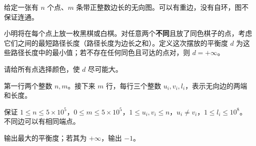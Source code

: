 \Legend
给定一张有 $n$ 个点、$m$ 条带正整数边长的无向图。可以有重边，没有自环，图不保证连通。

小明将在每个点上放一枚黑棋或白棋。对任意两个\textbf{不同}且放了同色棋子的点，考虑它们之间的最短路径长度（路径长度为边长之和）。定义这次摆放的平衡度 $d$ 为这些路径长度中的最小值；若不存在任何同色且可达的点对，则 $d=+\infty$。

请给所有点选择颜色，使 $d$ 尽可能大。

\Input

第一行两个整数 $n,m$。接下来 $m$ 行，每行三个整数 $u_i,v_i,l_i$，表示无向边的两端和长度。

保证 $1\le n\le5\times10^5$，$0\le m\le5\times10^5$，$1\le u_i,v_i\le n$，$u_i\ne v_i$，$1\le l_i\le10^8$。不同边可以有相同端点。

\Output

输出最大的平衡度；若其为 $+\infty$，输出 $-1$。

\Examples

\begin{example}
\end{example}
